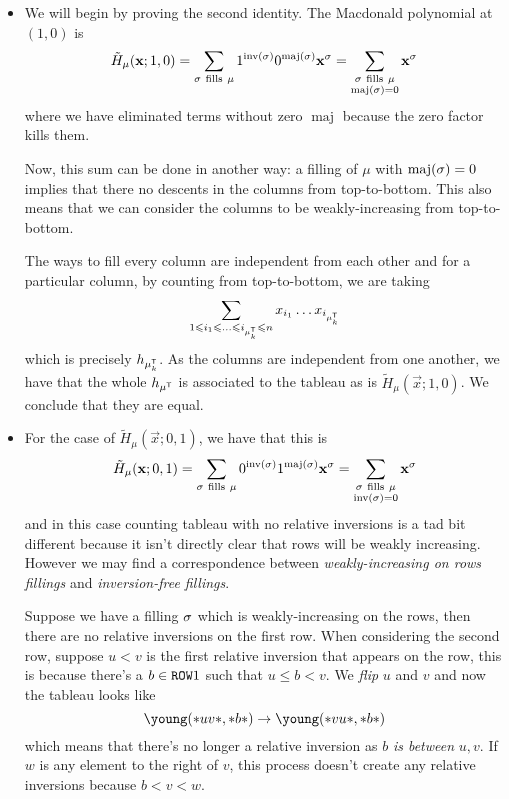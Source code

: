 \documentclass[12pt]{memoir}
\DeclareMathOperator{\inv}{inv}
\DeclareMathOperator{\maj}{maj}
\begin{document}
\begin{ptcbr}
    \begin{itemize}
        \item We will begin by proving the second identity. The Macdonald polynomial at $(1,0)$ is 
        $$\tilde{H}_\mu(\vec{x};1,0)=\sum_{\sg\ \text{fills}\ \mu}1^{\inv(\sg)}0^{\maj(\sg)}\vec{x}^\sg=\sum_{\substack{\sg\ \text{fills}\ \mu\\\maj(\sg)=0}}\vec{x}^\sg$$
        where we have eliminated terms without zero $\maj$ because the zero factor kills them.\par 
        Now, this sum can be done in another way: a filling of $\mu$ with $\maj(\sg)=0$ implies that there no descents in the columns from top-to-bottom. This also means that we can consider the columns to be weakly-increasing from top-to-bottom.\par 
        The ways to fill every column are independent from each other and for a particular column, by counting from top-to-bottom, we are taking 
        $$\sum_{1\leq i_1\leq\dots\leq i_{\mu^\sT_k}\leq n}x_{i_1}\dots x_{i_{\mu^\sT_k}}$$
        which is precisely $h_{\mu^{\mathsf{T}}_k}$. As the columns are independent from one another, we have that the whole $h_{\mu^{\mathsf{T}}}$ is associated to the tableau as is $\tilde{H}_\mu(\vec{x};1,0)$. We conclude that they are equal.
        \item For the case of $\tilde{H}_\mu(\vec{x};0,1)$, we have that this is 
        $$\tilde{H}_\mu(\vec{x};0,1)=\sum_{\sg\ \text{fills}\ \mu}0^{\inv(\sg)}1^{\maj(\sg)}\vec{x}^\sg=\sum_{\substack{\sg\ \text{fills}\ \mu\\\inv(\sg)=0}}\vec{x}^\sg$$
        and in this case counting tableau with no relative inversions is a tad bit different because it isn't directly clear that rows will be weakly increasing. However we may find a correspondence between \emph{weakly-increasing on rows fillings} and \emph{inversion-free fillings}.\par 
        Suppose we have a filling $\sigma$ which is weakly-increasing on the rows, then there are no relative inversions on the first row. When considering the second row, suppose $u<v$ is the first relative inversion that appears on the row, this is because there's a $b\in\texttt{ROW}1$ such that $u\leq b <v$. We \emph{flip} $u$ and $v$ and now the tableau looks like 
        $$\young(\ast uv\ast,\ast b\ast)\to\young(\ast vu\ast,\ast b\ast)$$
        which means that there's no longer a relative inversion as $b$ \emph{is between} $u,v$. If $w$ is any element to the right of $v$, this process doesn't create any relative inversions because $b<v<w$.\par 

\end{itemize}
\end{ptcbr}
\end{document}
